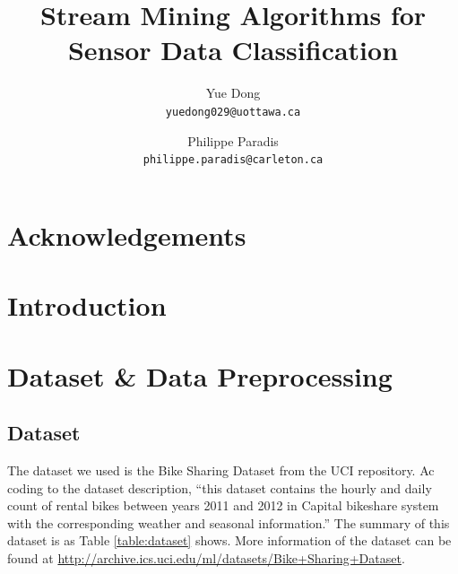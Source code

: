 \documentclass[12pt]{article}
\title{Stream Mining Algorithms for Sensor Data Classification}
\author{
    Yue Dong\\
	\texttt{yuedong029@uottawa.ca}
	\and
	Philippe Paradis\\
	\texttt{philippe.paradis@carleton.ca}
}
\begin{document}
\singlespace
\maketitle

\tableofcontents
\newpage
\section*{Acknowledgements}


\begin{abstract}                %


\end{abstract}

\setcounter{secnumdepth}{4}

\section{Introduction}
\label{sec:introduction}

\section{Dataset \& Data Preprocessing}
\subsection{Dataset}
The dataset we used is the Bike Sharing Dataset from the UCI repository. Ac coding to the dataset description, ``this dataset contains the hourly and daily count of rental bikes between years 2011 and 2012 in Capital bikeshare system with the corresponding weather and seasonal information.''
 The summary of this dataset is as Table \ref{table:dataset} shows. More information of the dataset can be found at \url{http://archive.ics.uci.edu/ml/datasets/Bike+Sharing+Dataset}.
 
\end{document}
